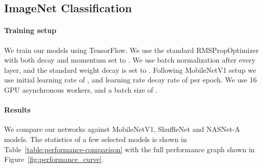 \documentclass[10pt,twocolumn,letterpaper]{article}
\begin{document}

\subsection{ImageNet Classification}
\paragraph{Training setup}
We train our models using TensorFlow\cite{tensorflow2015-whitepaper}.
We use the standard RMSPropOptimizer with both decay and momentum set to .
We use batch normalization after every layer, and the standard weight decay is set to .
Following \mbox{MobileNetV1}\cite{MobilenetV1} setup we use initial learning rate of , and learning rate decay rate of  per epoch.
We use 16 GPU asynchronous workers, and a batch size of .


\paragraph{Results}
We compare our networks against \mbox{MobileNetV1}, \mbox{ShuffleNet} and \mbox{NASNet-A} models.
The statistics of a few selected models is shown in Table~\ref{table:performance-comparison} with the full performance graph shown in  Figure~\ref{fig:performance_curve}.
 
\end{document}
